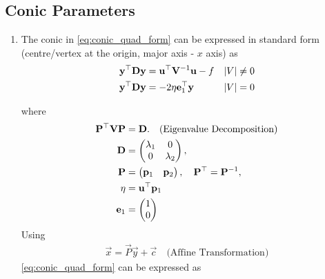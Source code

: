 \documentclass[journal,12pt,twocolumn]{IEEEtran}
\renewcommand\thesection{\arabic{section}}
\renewcommand\thesubsection{\thesection.\arabic{subsection}}
\begin{document}
\subsection{Conic Parameters}
\renewcommand{\theequation}{\theenumi}
\begin{enumerate}[label=\thesubsection.\arabic*.,ref=\thesubsection.\theenumi]
\item The conic in     \eqref{eq:conic_quad_form} can be expressed in standard form (centre/vertex at the origin, major axis - $x$ axis) as
  \begin{align}
    \label{eq:conic_simp_temp_nonparab}
    \mathbf{y}^{\top}\mathbf{D}\mathbf{y} &=  \mathbf{u}^{\top}\mathbf{V}^{-1}\mathbf{u} -f  &  \left\vert V\right\vert &\ne 0
    \\
    \mathbf{y}^{\top}\mathbf{D}\mathbf{y} &=  -2\eta\mathbf{e}_1^{\top}\mathbf{y}   & \left\vert V\right\vert &= 0
    \label{eq:conic_simp_temp_parab}
    \end{align}

    where
    \begin{align}
      \label{eq:conic_parmas_eig_def}
      \mathbf{P}^{\top}\mathbf{V}\mathbf{P} &= \mathbf{D}. \quad \text{(Eigenvalue Decomposition)}
      \\
      \mathbf{D} &= \begin{pmatrix}\lambda_1 & 0\\ 0 & \lambda_2\end{pmatrix}, 
      \\
      \mathbf{P} &= \begin{pmatrix}\mathbf{p}_1 & \mathbf{p}_2\end{pmatrix}, \quad \mathbf{P}^{\top}=\mathbf{P}^{-1},
      \label{eq:eigevecP}
      \\
      \label{eq:eta}
       \eta &=\mathbf{u}^{\top}\mathbf{p}_1
       \\
       \mathbf{e}_1 &=\begin{pmatrix}1 \\ 0\end{pmatrix}
      \end{align}
      \solution Using 
\begin{align}
\vec{x} = \vec{P}\vec{y}+\vec{c} \quad \text{(Affine Transformation)}
\label{eq:conic_affine}
\end{align}
\eqref{eq:conic_quad_form} can be expressed as


\end{enumerate}
\end{document}
